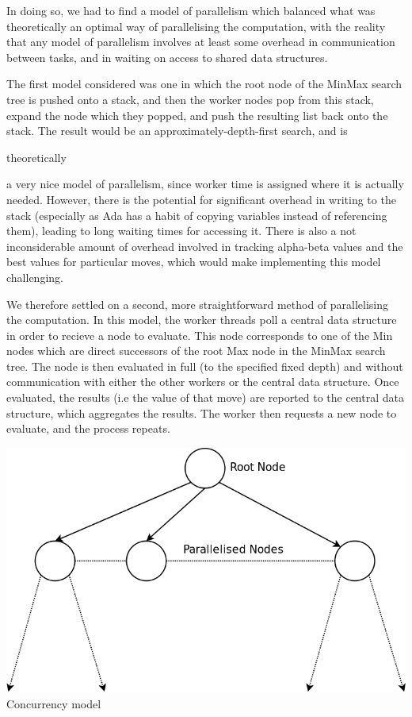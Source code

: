 \documentclass[10pt]{report}
\begin{document}
\begin{multicols}{2}
In doing so, we had to find a model of parallelism which balanced what was theoretically an optimal way of parallelising the computation, with the reality that any model of parallelism involves at least some overhead in communication between tasks, and in waiting on access to shared data structures.

The first model considered was one in which the root node of the MinMax search tree is pushed onto a stack, and then the worker nodes pop from this stack, expand the node which they popped, and push the resulting list back onto the stack. The result would be an approximately-depth-first search, and is \begin{em} theoretically \end{em} a very nice model of parallelism, since worker time is assigned where it is actually needed. However, there is the potential for significant overhead in writing to the stack (especially as Ada has a habit of copying variables instead of referencing them), leading to long waiting times for accessing it. There is also a not inconsiderable amount of overhead involved in tracking alpha-beta values and the best values for particular moves, which would make implementing this model challenging.

We therefore settled on a second, more straightforward method of parallelising the computation. In this model, the worker threads poll a central data structure in order to recieve a node to evaluate. This node corresponds to one of the Min nodes which are direct successors of the root Max node in the MinMax search tree. The node is then evaluated in full (to the specified fixed depth) and without communication with either the other workers or the central data structure. Once evaluated, the results (i.e the value of that move) are reported to the central data structure, which aggregates the results. The worker then requests a new node to evaluate, and the process repeats.

\begin{center}
\includegraphics[scale=0.31]{concurrency.png}
\\Concurrency model
\end{center}


\end{multicols}
\end{document}
